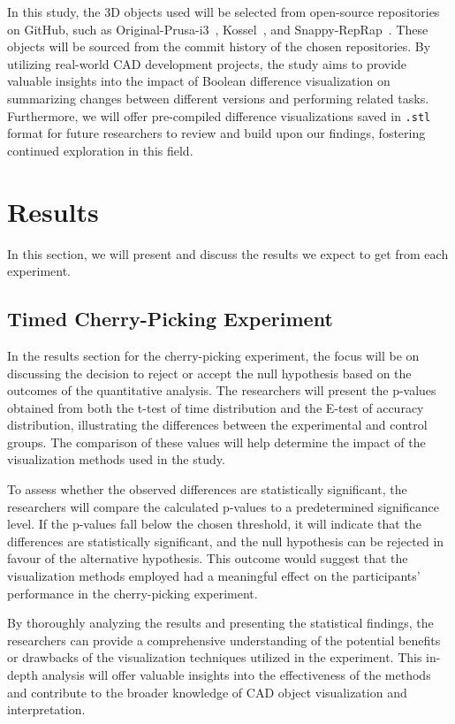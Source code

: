 \documentclass[sigconf,authorversion,nonacm]{acmart}
\begin{document}
In this study, the 3D objects used will be selected from open-source repositories on GitHub, such as Original-Prusa-i3~\cite{prusa3d_2022}, Kossel~\cite{ jcrocholl_2015}, and Snappy-RepRap~\cite{revarbat_2019}.
These objects will be sourced from the commit history of the chosen repositories. By utilizing real-world CAD development projects, the study aims to provide valuable insights into the impact of Boolean difference visualization on summarizing changes between different versions and performing related tasks.
Furthermore, we will offer pre-compiled difference visualizations saved in \texttt{.stl} format for future researchers to review and build upon our findings, fostering continued exploration in this field.

\section{Results}

In this section, we will present and discuss the results we expect to get from each experiment.

\subsection{Timed Cherry-Picking Experiment}

In the results section for the cherry-picking experiment, the focus will be on discussing the decision to reject or accept the null hypothesis based on the outcomes of the quantitative analysis.
The researchers will present the p-values obtained from both the t-test of time distribution and the E-test of accuracy distribution, illustrating the differences between the experimental and control groups.
The comparison of these values will help determine the impact of the visualization methods used in the study.

To assess whether the observed differences are statistically significant, the researchers will compare the calculated p-values to a predetermined significance level.
If the p-values fall below the chosen threshold, it will indicate that the differences are statistically significant, and the null hypothesis can be rejected in favour of the alternative hypothesis.
This outcome would suggest that the visualization methods employed had a meaningful effect on the participants' performance in the cherry-picking experiment.

By thoroughly analyzing the results and presenting the statistical findings, the researchers can provide a comprehensive understanding of the potential benefits or drawbacks of the visualization techniques utilized in the experiment.
This in-depth analysis will offer valuable insights into the effectiveness of the methods and contribute to the broader knowledge of CAD object visualization and interpretation.
\end{document}
